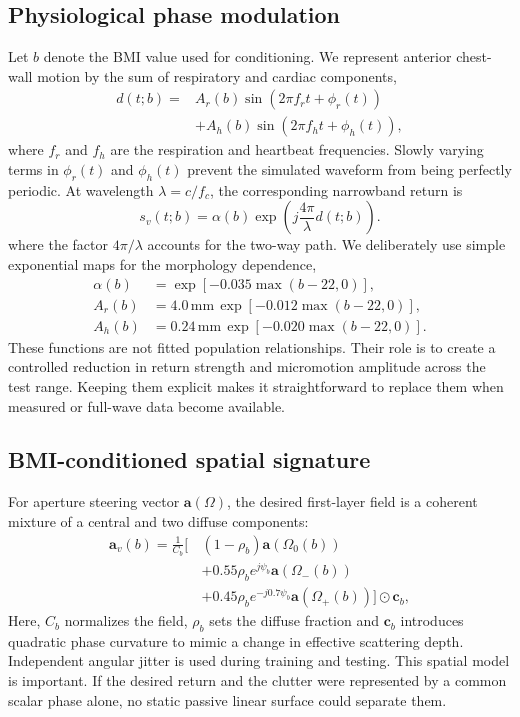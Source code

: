 \documentclass[pdflatex,sn-nature]{sn-jnl}
\newcommand{\vect}[1]{\bm{#1}}
\begin{document}
\subsection{Physiological phase modulation}
Let $b$ denote the BMI value used for conditioning. We represent anterior chest-wall
motion by the sum of respiratory and cardiac components,
\begin{equation}
\begin{aligned}
d(t;b)={}&A_r(b)\sin\!\left(2\pi f_r t+\phi_r(t)\right)\\
&+A_h(b)\sin\!\left(2\pi f_h t+\phi_h(t)\right),
\end{aligned}
\label{eq:displacement}
\end{equation}
where $f_r$ and $f_h$ are the respiration and heartbeat frequencies. Slowly varying
terms in $\phi_r(t)$ and $\phi_h(t)$ prevent the simulated waveform from being
perfectly periodic. At wavelength $\lambda=c/f_c$, the corresponding narrowband
return is
\begin{equation}
s_v(t;b)=\alpha(b)\exp\!\left(j\frac{4\pi}{\lambda}d(t;b)\right).
\label{eq:vitalreturn}
\end{equation}
where the factor $4\pi/\lambda$ accounts for the two-way path. We deliberately use
simple exponential maps for the morphology dependence,
\begin{align}
\alpha(b)&=\exp[-0.035\max(b-22,0)],\label{eq:alpha}\\
A_r(b)&=4.0\,\mathrm{mm}\,\exp[-0.012\max(b-22,0)],\label{eq:ar}\\
A_h(b)&=0.24\,\mathrm{mm}\,\exp[-0.020\max(b-22,0)].\label{eq:ah}
\end{align}
These functions are not fitted population relationships. Their role is to create a
controlled reduction in return strength and micromotion amplitude across the test
range. Keeping them explicit makes it straightforward to replace them when measured
or full-wave data become available.

\subsection{BMI-conditioned spatial signature}
For aperture steering vector $\vect a(\Omega)$, the desired first-layer field is a
coherent mixture of a central and two diffuse components:
\begin{equation}
\begin{aligned}
\vect a_v(b)=\frac{1}{C_b}\Big[\,&(1-\rho_b)\vect a(\Omega_0(b))\\
&+0.55\rho_b e^{j\psi_b}\vect a(\Omega_-(b))\\
&+0.45\rho_b e^{-j0.7\psi_b}\vect a(\Omega_+(b))\Big]
\odot\vect c_b,
\end{aligned}
\label{eq:morphology}
\end{equation}
Here, $C_b$ normalizes the field, $\rho_b$ sets the diffuse fraction and $\vect c_b$
introduces quadratic phase curvature to mimic a change in effective scattering depth.
Independent angular jitter is used during training and testing. This spatial model is
important. If the desired return and the clutter were represented by a common scalar
phase alone, no static passive linear surface could separate them.
\end{document}
